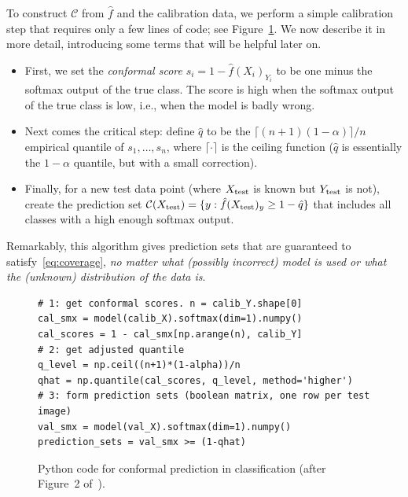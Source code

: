 \documentclass[11pt]{article}
\theoremstyle{definition}
\newcommand{\C}{\mathcal{C}}
\newcommand{\fhat}{\hat{f}}
\newcommand{\qhat}{\hat{q}}
\newcommand{\Xtest}{X_{\rm test}}
\newcommand{\Ytest}{Y_{\rm test}}
\begin{document}
To construct $\C$ from $\fhat$ and the calibration data, we perform a simple calibration step that requires only a few lines of code; see Figure~\ref{fig:code-basic}. We now describe it in more detail, introducing some terms that will be helpful later on.
\begin{itemize}[leftmargin=1.5em]
\item First, we set the \emph{conformal score} $s_i = 1-\fhat(X_i)_{Y_i}$ to be one minus the softmax output of the true class. The score is high when the softmax output of the true class is low, i.e., when the model is badly wrong.
\item Next comes the critical step: define $\qhat$ to be the $\lceil (n+1)(1-\alpha)\rceil/n$ empirical quantile of $s_1,\dots,s_n$, where $\lceil\cdot\rceil$ is the ceiling function ($\qhat$ is essentially the $1-\alpha$ quantile, but with a small correction).
\item Finally, for a new test data point (where $\Xtest$ is known but $\Ytest$ is not), create the prediction set $\C(\Xtest)=\{y:\fhat(\Xtest)_y\ge 1-\qhat\}$ that includes all classes with a high enough softmax output.
\end{itemize}
\begin{keybox}
Remarkably, this algorithm gives prediction sets that are guaranteed to satisfy~\eqref{eq:coverage}, \emph{no matter what (possibly incorrect) model is used or what the (unknown) distribution of the data is}.
\end{keybox}

\begin{figure}[H]
\begin{snugshade}
\begin{Verbatim}
# 1: get conformal scores. n = calib_Y.shape[0]
cal_smx = model(calib_X).softmax(dim=1).numpy()
cal_scores = 1 - cal_smx[np.arange(n), calib_Y]
# 2: get adjusted quantile
q_level = np.ceil((n+1)*(1-alpha))/n
qhat = np.quantile(cal_scores, q_level, method='higher')
# 3: form prediction sets (boolean matrix, one row per test image)
val_smx = model(val_X).softmax(dim=1).numpy()
prediction_sets = val_smx >= (1-qhat)
\end{Verbatim}
\end{snugshade}
\caption{Python code for conformal prediction in classification (after Figure~2 of~\cite{gentle}).}
\label{fig:code-basic}
\end{figure}
\end{document}

